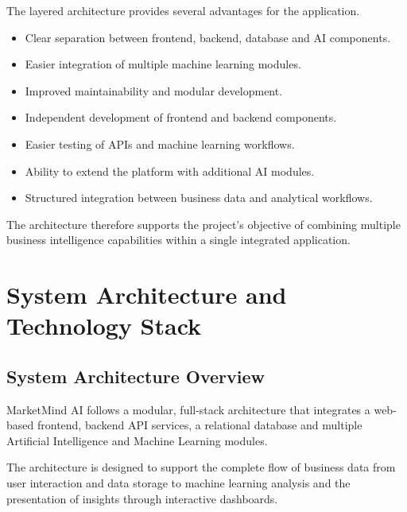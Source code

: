 \documentclass[12pt,a4paper]{report}
\begin{document}
The layered architecture provides several advantages for the application.

\begin{itemize}[leftmargin=1.2cm]

\item Clear separation between frontend, backend, database and AI
components.

\item Easier integration of multiple machine learning modules.

\item Improved maintainability and modular development.

\item Independent development of frontend and backend components.

\item Easier testing of APIs and machine learning workflows.

\item Ability to extend the platform with additional AI modules.

\item Structured integration between business data and analytical
workflows.

\end{itemize}

The architecture therefore supports the project's objective of combining
multiple business intelligence capabilities within a single integrated
application.


\newpage


\chapter{System Architecture and Technology Stack}

\section{System Architecture Overview}

MarketMind AI follows a modular, full-stack architecture that integrates
a web-based frontend, backend API services, a relational database and
multiple Artificial Intelligence and Machine Learning modules.

The architecture is designed to support the complete flow of business
data from user interaction and data storage to machine learning analysis
and the presentation of insights through interactive dashboards.
\end{document}
